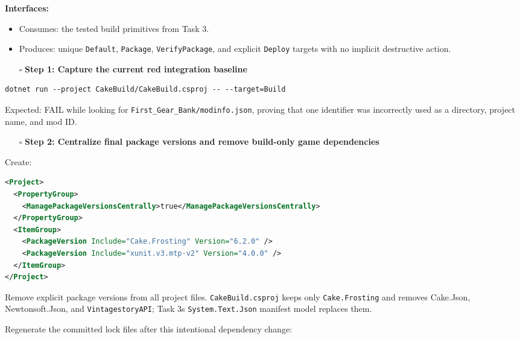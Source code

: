 \documentclass[
  10pt,
  letterpaper,
]{article}
\newcommand{\passthrough}[1]{#1}
\providecommand{\tightlist}{%
  \setlength{\itemsep}{0pt}\setlength{\parskip}{0pt}}
\begin{document}
\textbf{Interfaces:}

\begin{itemize}
\tightlist
\item
  Consumes: the tested build primitives from Task 3.
\item
  Produces: unique \passthrough{\lstinline!Default!},
  \passthrough{\lstinline!Package!},
  \passthrough{\lstinline!VerifyPackage!}, and explicit
  \passthrough{\lstinline!Deploy!} targets with no implicit destructive
  action.
\end{itemize}

\begin{itemize}
\tightlist
\item[$\square$]
  \textbf{Step 1: Capture the current red integration baseline}
\end{itemize}

\begin{lstlisting}
dotnet run --project CakeBuild/CakeBuild.csproj -- --target=Build
\end{lstlisting}

Expected: FAIL while looking for
\texttt{First\_}\allowbreak{}\texttt{Gear\_}\allowbreak{}\texttt{Bank/}\allowbreak{}\texttt{modinfo.}\allowbreak{}\texttt{json},
proving that one identifier was incorrectly used as a directory, project
name, and mod ID.

\begin{itemize}
\tightlist
\item[$\square$]
  \textbf{Step 2: Centralize final package versions and remove
  build-only game dependencies}
\end{itemize}

Create:

\begin{lstlisting}[language=XML]
<Project>
  <PropertyGroup>
    <ManagePackageVersionsCentrally>true</ManagePackageVersionsCentrally>
  </PropertyGroup>
  <ItemGroup>
    <PackageVersion Include="Cake.Frosting" Version="6.2.0" />
    <PackageVersion Include="xunit.v3.mtp-v2" Version="4.0.0" />
  </ItemGroup>
</Project>
\end{lstlisting}

Remove explicit package versions from all project files.
\passthrough{\lstinline!CakeBuild.csproj!} keeps only
\passthrough{\lstinline!Cake.Frosting!} and removes Cake.Json,
Newtonsoft.Json, and \passthrough{\lstinline!VintagestoryAPI!}; Task
3\textquotesingle s \passthrough{\lstinline!System.Text.Json!} manifest
model replaces them.

Regenerate the committed lock files after this intentional dependency
change:
\end{document}
